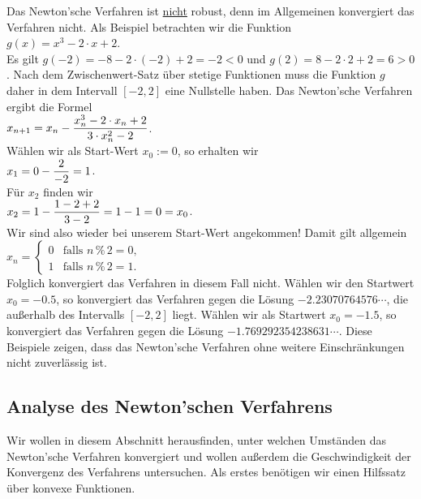Das Newton'sche Verfahren ist \underline{nicht} robust, denn im Allgemeinen  konvergiert das Verfahren
nicht.  Als Beispiel betrachten wir die 
Funktion 
\\[0.2cm]
\hspace*{1.3cm}
$g(x) = x^3 - 2 \cdot x + 2$.
\\[0.2cm]
Es gilt $g(-2) = -8 - 2 \cdot (-2) + 2 = -2 < 0$ und $g(2) = 8 - 2 \cdot 2 + 2 = 6 > 0$.  Nach dem 
Zwischenwert-Satz \"uber stetige Funktionen muss die Funktion $g$ daher in dem Intervall $[-2, 2]$ eine
Nullstelle haben.  Das Newton'sche Verfahren ergibt die Formel
\\[0.2cm]
\hspace*{1.3cm}
$\displaystyle x_{n+1} = x_n - \frac{x_n^3 - 2 \cdot x_n + 2}{3 \cdot x_n^2 - 2}$.
\\[0.2cm]
W\"ahlen wir als Start-Wert $x_0 := 0$, so erhalten wir 
\\[0.2cm]
\hspace*{1.3cm}
$\displaystyle x_1 = 0 - \frac{2}{-2} = 1$.
\\[0.2cm]
F\"ur $x_2$ finden wir
\\[0.2cm]
\hspace*{1.3cm}
$\displaystyle x_{2} = 1 - \frac{1 - 2 + 2}{3 - 2} = 1 - 1 = 0 = x_0$.
\\[0.2cm]
Wir sind also wieder bei unserem Start-Wert angekommen!  Damit gilt allgemein
\\[0.2cm]
\hspace*{1.3cm}
$x_n = \left\{
\begin{array}{ll}
  0 & \mbox{falls $n \,\texttt{\%}\, 2 = 0$,} \\[0.2cm]
  1 & \mbox{falls $n \,\texttt{\%}\, 2 = 1$.}
\end{array} 
\right.
$
\\[0.2cm] %
Folglich konvergiert das Verfahren in diesem Fall nicht.  W\"ahlen wir den Startwert $x_0 = -0.5$, so
konvergiert das Verfahren gegen die L\"osung $-2.23070764576\cdots$, die au{\ss}erhalb des Intervalls $[-2,2]$
liegt.  W\"ahlen wir als Startwert $x_0 = -1.5$, so konvergiert das Verfahren gegen die L\"osung
$-1.769292354238631\cdots$.  Diese Beispiele zeigen, dass das Newton'sche Verfahren ohne weitere
Einschr\"ankungen nicht zuverl\"assig ist.

\subsection{Analyse des Newton'schen Verfahrens}
Wir wollen in diesem Abschnitt herausfinden, unter welchen Umst\"anden das Newton'sche Verfahren
konvergiert und wollen au{\ss}erdem die Geschwindigkeit der Konvergenz des Verfahrens untersuchen.
Als erstes ben\"otigen wir einen Hilfssatz \"uber konvexe Funktionen.

